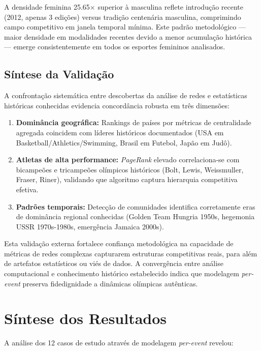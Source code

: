 A densidade feminina 25.65× superior à masculina reflete introdução recente (2012, apenas 3 edições) versus tradição centenária masculina, comprimindo campo competitivo em janela temporal mínima. Este padrão metodológico — maior densidade em modalidades recentes devido a menor acumulação histórica — emerge consistentemente em todos os esportes femininos analisados.

\subsection{Síntese da Validação}

A confrontação sistemática entre descobertas da análise de redes e estatísticas históricas conhecidas evidencia concordância robusta em três dimensões:

\begin{enumerate}
    \item \textbf{Dominância geográfica:} Rankings de países por métricas de centralidade agregada coincidem com líderes históricos documentados (USA em Basketball/Athletics/Swimming, Brasil em Futebol, Japão em Judô).

    \item \textbf{Atletas de alta performance:} \textit{PageRank} elevado correlaciona-se com bicampeões e tricampeões olímpicos históricos (Bolt, Lewis, Weissmuller, Fraser, Riner), validando que algoritmo captura hierarquia competitiva efetiva.

    \item \textbf{Padrões temporais:} Detecção de comunidades identifica corretamente eras de dominância regional conhecidas (Golden Team Hungria 1950s, hegemonia USSR 1970s-1980s, emergência Jamaica 2000s).
\end{enumerate}

Esta validação externa fortalece confiança metodológica na capacidade de métricas de redes complexas capturarem estruturas competitivas reais, para além de artefatos estatísticos ou viés de dados. A convergência entre análise computacional e conhecimento histórico estabelecido indica que modelagem \textit{per-event} preserva fidedignidade a dinâmicas olímpicas autênticas.

\section{Síntese dos Resultados}

A análise dos 12 casos de estudo através de modelagem \textit{per-event} revelou:

